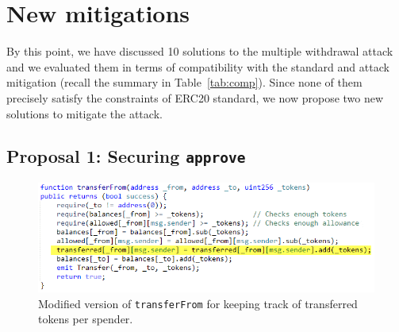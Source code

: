 
\section{New mitigations}

By this point, we have discussed 10 solutions to the multiple withdrawal attack and we evaluated them in terms of compatibility with the standard and attack mitigation (recall the summary in Table~\ref{tab:comp}). Since none of them precisely satisfy the constraints of ERC20 standard, we now propose two new solutions to mitigate the attack.


\subsection{Proposal 1: Securing \texttt{approve}}
\label{sec:proposal1}

\begin{figure}[t]
	\centering
	\includegraphics[width=1.0\linewidth]{figures/multiple_withdrawal_14.png}
	\caption{Modified version of \texttt{transferFrom} for keeping track of transferred tokens per spender.\label{fig:transfer1}}
\end{figure}


